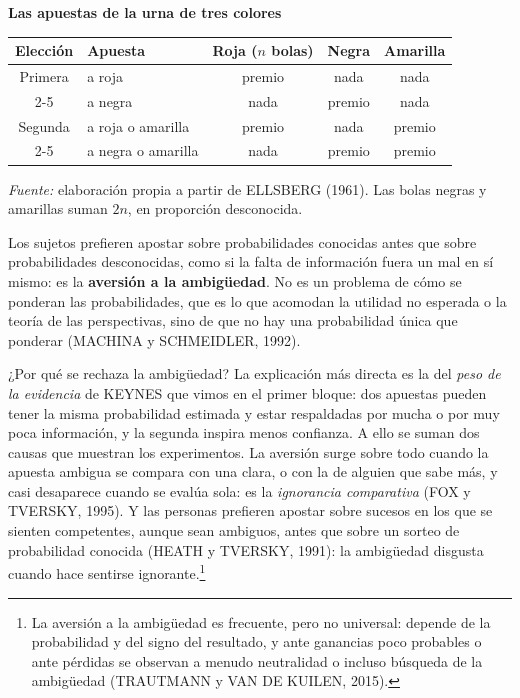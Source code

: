 \documentclass[10pt,a4paper]{article}
\begin{document}
\begin{center}\begin{minipage}{\linewidth}\centering
{\small\textbf{Las apuestas de la urna de tres colores}}\par\vspace{0.3em}
{\footnotesize\setlength{\tabcolsep}{6pt}\renewcommand{\arraystretch}{1.35}%
\begin{tabular}{|c|l|c|c|c|}
\hline
\textbf{Elección} & \textbf{Apuesta} & \textbf{Roja} ($n$ bolas) & \textbf{Negra} & \textbf{Amarilla}\tabularnewline\hline
Primera & a roja & premio & nada & nada\tabularnewline\cline{2-5}
 & a negra & nada & premio & nada\tabularnewline\hline
Segunda & a roja o amarilla & premio & nada & premio\tabularnewline\cline{2-5}
 & a negra o amarilla & nada & premio & premio\tabularnewline\hline
\end{tabular}}\par\vspace{0.3em}
{\small\textit{Fuente: }elaboración propia a partir de ELLSBERG (1961). Las bolas negras y amarillas suman $2n$, en proporción desconocida.}
\end{minipage}\end{center}

Los sujetos prefieren apostar sobre probabilidades conocidas antes que sobre probabilidades desconocidas, como si la falta de información fuera un mal en sí mismo: es la \textbf{aversión a la ambigüedad}. No es un problema de cómo se ponderan las probabilidades, que es lo que acomodan la utilidad no esperada o la teoría de las perspectivas, sino de que no hay una probabilidad única que ponderar (MACHINA y SCHMEIDLER, 1992).

¿Por qué se rechaza la ambigüedad? La explicación más directa es la del \textit{peso de la evidencia} de KEYNES que vimos en el primer bloque: dos apuestas pueden tener la misma probabilidad estimada y estar respaldadas por mucha o por muy poca información, y la segunda inspira menos confianza. A ello se suman dos causas que muestran los experimentos. La aversión surge sobre todo cuando la apuesta ambigua se compara con una clara, o con la de alguien que sabe más, y casi desaparece cuando se evalúa sola: es la \textit{ignorancia comparativa} (FOX y TVERSKY, 1995). Y las personas prefieren apostar sobre sucesos en los que se sienten competentes, aunque sean ambiguos, antes que sobre un sorteo de probabilidad conocida (HEATH y TVERSKY, 1991): la ambigüedad disgusta cuando hace sentirse ignorante.\footnote{%
    La aversión a la ambigüedad es frecuente, pero no universal: depende de la probabilidad y del signo del resultado, y ante ganancias poco probables o ante pérdidas se observan a menudo neutralidad o incluso búsqueda de la ambigüedad (TRAUTMANN y VAN DE KUILEN, 2015).
}
\end{document}
